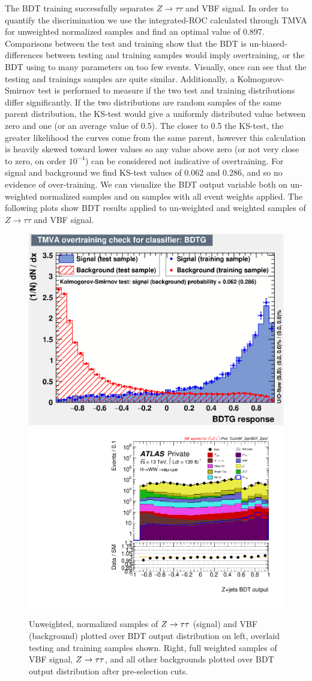 The BDT training successfully separates $Z\rightarrow\tau\tau$ and VBF signal. In order to quantify the discrimination we use the integrated-ROC calculated through TMVA for unweighted normalized samples and find an optimal value of 0.897. Comparisons between the test and training show that the BDT is un-biased- differences between testing and training samples would imply overtraining, or the BDT using to many parameters on too few events. Visually, once can see that the testing and trainings samples are quite similar. Additionally, a Kolmogorov-Smirnov test is performed to measure if the two test and training distributions differ significantly. If the two distributions are random samples of the same parent distribution, the KS-test would give a uniformly distributed value between zero and one (or an average value of 0.5). The closer to 0.5 the KS-test, the greater likelihood the curves come from the same parent, however this calculation is heavily skewed toward lower values so any value above zero (or not very close to zero, on order $10^{-4}$) can be considered not indicative of overtraining. For signal and background we find KS-test values of 0.062 and 0.286, and so no evidence of over-training. We can visualize the BDT output variable both on un-weighted normalized samples and on samples with all event weights applied. The following plots show BDT results applied to un-weighted and weighted samples of $Z\rightarrow\tau\tau$ and VBF signal.

\begin{figure}[!htbp]
 \centering
  \includegraphics[width=.45\linewidth]{Pictures/ZttBDT/overtrain_BDTG.eps}
  \includegraphics[width=.35\linewidth]{Pictures/run2-emme-CutVBF_2jet-BDT_Zjets-log.pdf}
\caption{Unweighted, normalized samples of $Z\rightarrow\tau\tau$ (signal) and VBF (background) plotted over BDT output distribution on left, overlaid testing and training samples shown. Right, full weighted samples of VBF signal, $Z\rightarrow\tau\tau$, and all other backgrounds plotted over BDT output distribution after pre-selection cuts.}
\label{fig:ZjetsBDTresult}
\end{figure}


